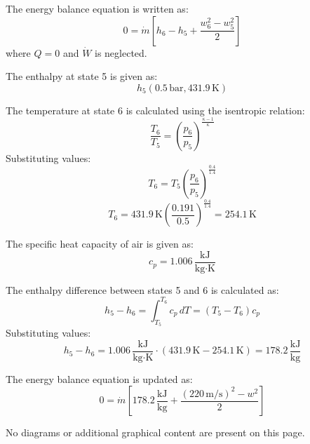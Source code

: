 The energy balance equation is written as:  
\[
0 = \dot{m} \left[ h_6 - h_5 + \frac{w_6^2 - w_5^2}{2} \right]
\]  
where \( Q = 0 \) and \( \dot{W} \) is neglected.

The enthalpy at state 5 is given as:  
\[
h_5 (0.5 \, \text{bar}, 431.9 \, \text{K})
\]  

The temperature at state 6 is calculated using the isentropic relation:  
\[
\frac{T_6}{T_5} = \left( \frac{p_6}{p_5} \right)^{\frac{\kappa - 1}{\kappa}}
\]  
Substituting values:  
\[
T_6 = T_5 \left( \frac{p_6}{p_5} \right)^{\frac{0.4}{1.4}}
\]  
\[
T_6 = 431.9 \, \text{K} \left( \frac{0.191}{0.5} \right)^{\frac{0.4}{1.4}} = 254.1 \, \text{K}
\]  

The specific heat capacity of air is given as:  
\[
c_p = 1.006 \, \frac{\text{kJ}}{\text{kg·K}}
\]  

The enthalpy difference between states 5 and 6 is calculated as:  
\[
h_5 - h_6 = \int_{T_5}^{T_6} c_p \, dT = (T_5 - T_6) c_p
\]  
Substituting values:  
\[
h_5 - h_6 = 1.006 \, \frac{\text{kJ}}{\text{kg·K}} \cdot (431.9 \, \text{K} - 254.1 \, \text{K}) = 178.2 \, \frac{\text{kJ}}{\text{kg}}
\]  

The energy balance equation is updated as:  
\[
0 = \dot{m} \left[ 178.2 \, \frac{\text{kJ}}{\text{kg}} + \frac{(220 \, \text{m/s})^2 - w^2}{2} \right]
\]  

No diagrams or additional graphical content are present on this page.